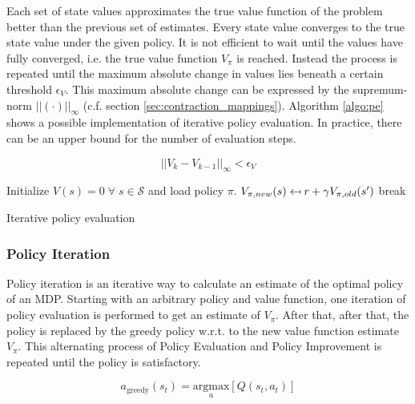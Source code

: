 Each set of state values approximates the true value function of the problem better than the previous set of estimates. Every state value converges to the true state value under the given policy. It is not efficient to wait until the values have fully converged, i.e. the true value function $V_\pi$ is reached. Instead the process is repeated until the maximum absolute change in values lies beneath a certain threshold $\epsilon_V$. This maximum absolute change can be expressed by the supremum-norm $||(\cdot)||_\infty$ (c.f. section \ref{sec:contraction_mappings}). Algorithm \ref{algo:pe} shows a possible implementation of iterative policy evaluation. In practice, there can be an upper bound for the number of evaluation steps.

\begin{equation}
||V_{k}-V_{k-1}||_\infty<\epsilon_V
\label{eq:pe_stopping_criterion}
\end{equation}

\begin{algorithm}[hbt]
	
	\begin{algorithmic}[0] %
		
		\State Initialize $V(s) = 0 \; \forall \; s \in \mathcal{S}$ and load policy $\pi$.
		\State $V_{\pi,new}(s) \mathrel{\reflectbox{\ensuremath{\mapsto}}} r+\gamma V_ {\pi,old}(s')$
		\EndFor
		\State break
		\EndIf
		\EndWhile
		\EndFunction
	\end{algorithmic}
	\caption{Iterative policy evaluation}
	\label{algo:pe}
\end{algorithm}

\subsubsection{Policy Iteration}
\label{sec:PI}
Policy iteration is an iterative way to calculate an estimate of the optimal policy of an MDP. Starting with an arbitrary policy and value function, one iteration of policy evaluation is performed to get an estimate of $V_\pi$. After that, after that, the policy is replaced by the greedy policy w.r.t. to the new value function estimate $V_\pi$. This alternating process of Policy Evaluation and Policy Improvement is repeated until the policy is satisfactory.

\begin{equation}
a_{\text{greedy}}(s_t) = \underset{a}{\text{argmax}}[Q(s_t,a_t)]
\label{eq:get_greedy_action}
\end{equation}

